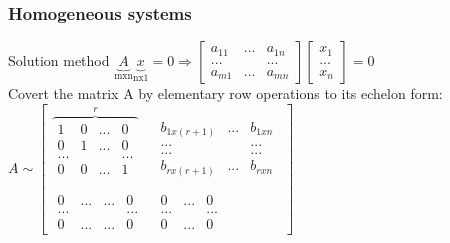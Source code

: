 \begin{frame}
	\frametitle{Homogeneous systems}
	\begin{block}{Solution method}
		$\underbrace{A}_\text{mxn}\underbrace{x}_\text{nx1}=0 \Rightarrow \begin{bmatrix}
		a_{11} & ... & a_{1n}\\
		... & & ...\\
		a_{m1} & ... & a_{mn}
		\end{bmatrix}\begin{bmatrix}
			x_1\\...\\x_n
		\end{bmatrix}=0$\\
		Covert the matrix A by elementary row operations to its echelon form: \\
		$A\sim\begin{bmatrix}
		\overbrace{\begin{matrix}
		1 & 0 &...& 0\\
		0 & 1 &... & 0\\
		... & & & ...\\
		0 & 0 &... & 1\\
		 & & &
		\end{matrix}}^r & \begin{matrix}
		b_{1x(r+1)} & ... & b_{1xn}\\
		... & & ...\\
		... & & ...\\
		b_{rx(r+1)} & ... & b_{rxn}\\
		 & & 
		\end{matrix}\\
		\begin{matrix}
		0 & ... & ... & 0\\
		... & & & ...\\
		0 & ... & ... & 0
		\end{matrix} & \begin{matrix}
		0 & ... & 0\\
		... & & ...\\
		0 & ... & 0
		\end{matrix}
		\end{bmatrix}$
	\end{block}
\end{frame}

